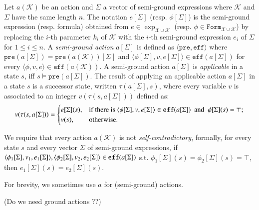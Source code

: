 \documentclass[review]{elsarticle}
\newcommand{\formula}{\mathtt{Form}}
\newcommand{\tuple}[1]{\langle {#1} \rangle}
\newcommand{\true}{\top}
\newcommand{\statevar}{\mathcal{X}}
\newcommand{\actparm}{\mathcal{K}}
\newcommand{\parmset}{\mathcal{K}}
\newcommand{\expVec}{\Sigma}
\newcommand{\pre}{\mathtt{pre}}
\newcommand{\eff}{\mathtt{eff}}
\newcommand{\con}{\phi}
\newcommand{\suc}{\tau}
\begin{document}
	
	Let $a(\parmset)$ be an action and $\expVec$ a vector of semi-ground expressions where $\parmset$ and $\expVec$ have the same length $n$.
	The notation $e[\expVec]$ (resp. $\phi[\expVec]$) is the semi-ground expression (resp. formula) obtained from $e \in \exp_{\statevar \cup \parmset}$ (resp. $\phi \in \formula_{\statevar \cup \parmset}$) by replacing the $i$-th parameter $k_i$ of $\actparm$ with the $i$-th semi-ground expression $e_i$ of $\expVec$ for $1 \leq i \leq n$. 
	A \textit{semi-ground action} $a[\expVec]$ is defined as $\tuple{\pre, \eff}$ where $\pre(a[\expVec]) = \pre(a(\parmset))[\expVec]$ and $\tuple{\con[\expVec], v, e[\expVec]} \in \eff(a[\expVec])$ for every $\tuple{\con, v, e} \in \eff(a(\parmset))$.
	A semi-ground action $a[\expVec]$ is \textit{applicable} in a state $s$, iff $s \models \pre(a[\expVec])$.
	The result of applying an applicable action $a[\expVec]$ in a state $s$ is a successor state, written $\suc(a[\expVec], s)$, where every variable $v$ is associated to an integer $v(\suc(s, a[\expVec]))$ defined as:	
	\[v(\suc(s, a[\expVec])) =
	\begin{cases}
		e[\expVec](s), & \text{if there is } \tuple{\con[\expVec], v, e[\expVec]} \in \eff(a[\expVec])$ \text{ and } $\con[\expVec](s) = \true; \\
		v(s), & \text{otherwise. } 
	\end{cases}\]
	
	We require that every action $a(\parmset)$ is not \textit{self-contradictory}, formally, for every state $s$ and every vector $\expVec$ of semi-ground expressions, if $\tuple{\con_1[\expVec], v_1, e_1[\expVec]}, \\ \tuple{\con_2[\expVec], v_2, e_2[\expVec]} \in \eff(a[\expVec])$ s.t. $\con_1[\expVec](s) = \con_2[\expVec](s) = \true$, then $e_1[\expVec](s) = e_2[\expVec](s)$.
	
	For brevity, we sometimes use $a$ for (semi-ground) actions.
	
	(Do we need ground actions ??)
\end{document}

